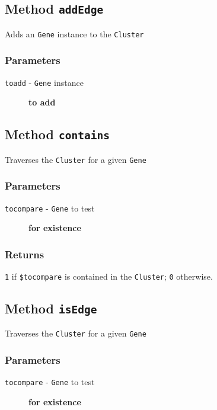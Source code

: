 \subsection*{Method \texttt{addEdge}\label{Method_addEdge}}


Adds an \texttt{Gene} instance to the \texttt{Cluster}

\subsubsection*{Parameters\label{Parameters}}
\begin{description}

\item[{\texttt{toadd} - \texttt{Gene} instance}] \textbf{to add}\end{description}
\subsection*{Method \texttt{contains}\label{Method_contains}}


Traverses the \texttt{Cluster} for a given \texttt{Gene}

\subsubsection*{Parameters\label{Parameters}}
\begin{description}

\item[{\texttt{tocompare} - \texttt{Gene} to test}] \textbf{for existence}\end{description}
\subsubsection*{Returns\label{Returns}}


\texttt{1} if \texttt{\$tocompare} is contained in the \texttt{Cluster}; \texttt{0} otherwise.

\subsection*{Method \texttt{isEdge}\label{Method_isEdge}}


Traverses the \texttt{Cluster} for a given \texttt{Gene}

\subsubsection*{Parameters\label{Parameters}}
\begin{description}

\item[{\texttt{tocompare} - \texttt{Gene} to test}] \textbf{for existence}\end{description}
